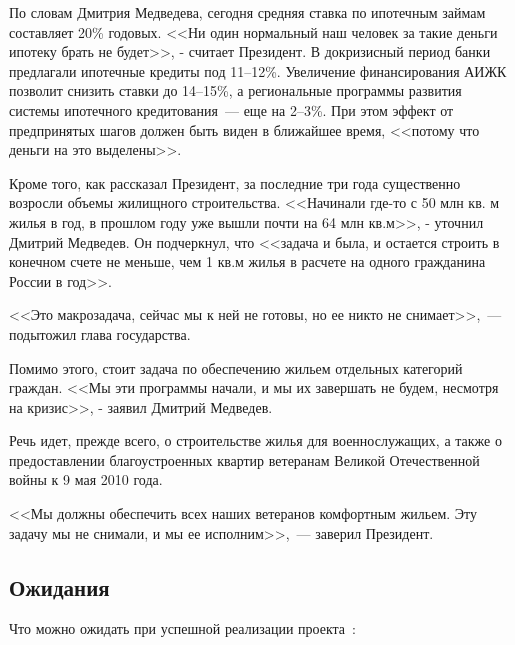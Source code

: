 \documentclass[article, 12pt, russian, oneside]{ncc}
\begin{document}
По словам Дмитрия Медведева, сегодня средняя ставка по ипотечным
займам составляет 20\% годовых. <<Ни один нормальный наш человек за
такие деньги ипотеку брать не будет>>, - считает Президент. В
докризисный период банки предлагали ипотечные кредиты под
11--12\%. Увеличение финансирования АИЖК позволит снизить ставки до
14--15\%, а региональные программы развития системы ипотечного
кредитования~--- еще на 2--3\%. При этом эффект от предпринятых шагов
должен быть виден в ближайшее время, <<потому что деньги на это
выделены>>.

Кроме того, как рассказал Президент, за последние три года существенно
возросли объемы жилищного строительства. <<Начинали где-то с 50 млн
кв. м жилья в год, в прошлом году уже вышли почти на 64 млн кв.м>>, -
уточнил Дмитрий Медведев. Он подчеркнул, что <<задача и была, и
остается строить в конечном счете не меньше, чем 1 кв.м жилья в
расчете на одного гражданина России в год>>.

<<Это макрозадача, сейчас мы к ней не готовы, но ее никто не
снимает>>,~---подытожил глава государства.

Помимо этого, стоит задача по обеспечению жильем отдельных категорий
граждан. <<Мы эти программы начали, и мы их завершать не будем,
несмотря на кризис>>, - заявил Дмитрий Медведев.

Речь идет, прежде всего, о строительстве жилья для военнослужащих, а
также о предоставлении благоустроенных квартир ветеранам Великой
Отечественной войны к 9 мая 2010 года.

<<Мы должны обеспечить всех наших ветеранов комфортным жильем. Эту
задачу мы не снимали, и мы ее исполним>>,~--- заверил Президент.

\subsection{Ожидания}

Что можно ожидать при успешной реализации проекта~\cite{Hub_Waitings}:
\end{document}
